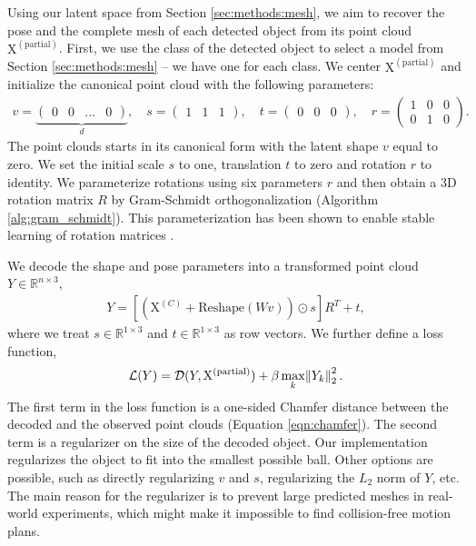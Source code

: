 \documentclass{article}
\newcommand{\pcx}[1]{\mathrm{X}^{(#1)}}
\newcommand{\pcc}{\pcx{C}}
\begin{document}
Using our latent space from Section \ref{sec:methods:mesh}, we aim to recover the pose and the complete mesh of each detected object from its point cloud $\pcx{\mathrm{partial}}$. First, we use the class of the detected object to select a model from Section \ref{sec:methods:mesh} -- we have one for each class. We center $\pcx{\mathrm{partial}}$ and initialize the canonical point cloud with the following parameters:
\begin{align}
    v = \underbrace{\begin{pmatrix} 0 & 0 & ... & 0 \end{pmatrix}}_d,\quad s = \begin{pmatrix} 1 & 1 & 1 \end{pmatrix},\quad t = \begin{pmatrix} 0 & 0 & 0 \end{pmatrix},\quad r = \begin{pmatrix} 1 & 0 & 0 \\ 0 & 1 & 0 \end{pmatrix}.
\end{align}
The point clouds starts in its canonical form with the latent shape $v$ equal to zero. We set the initial scale $s$ to one, translation $t$ to zero and 
rotation $r$ to identity. We parameterize rotations using six parameters $r$ and then obtain a 3D rotation matrix $R$ by Gram-Schmidt orthogonalization (Algorithm \ref{alg:gram_schmidt}). This parameterization has been shown to enable stable learning of rotation matrices \cite{falorsi18explorations, park22learning}.

We decode the shape and pose parameters into a transformed point cloud $Y \in \mathbb{R}^{n \times 3}$,
\begin{align}
    Y = [(\pcc + \mathrm{Reshape}(W v)) \odot s] R^T + t,
    \label{eq:dec}
\end{align}
where we treat $s \in \mathbb{R}^{1 \times 3}$ and $t \in \mathbb{R}^{1 \times 3}$ as row vectors.
We further define a loss function,
\begin{align}
    \mathcal{L}(Y) = \mathcal{D}(Y, \pcx{\mathrm{partial}}) + \beta \max_k \norm{Y_k}_2^2.
\end{align}
The first term in the loss function is a one-sided Chamfer distance between the decoded and the observed point clouds (Equation \ref{eqn:chamfer}). The second term is a regularizer on the size of the decoded object. Our implementation regularizes the object to fit into the smallest possible ball. Other options are possible, such as directly regularizing $v$ and $s$, regularizing the $L_2$ norm of $Y$, etc. The main reason for the regularizer is to prevent large predicted meshes in real-world experiments, which might make it impossible to find collision-free motion plans.
\end{document}
